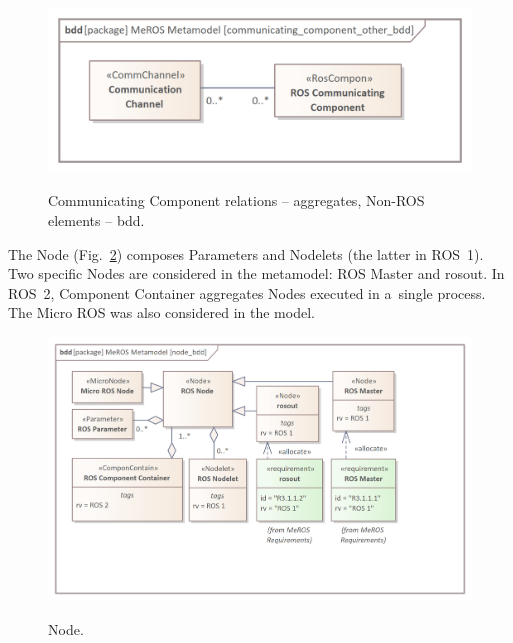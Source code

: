 \documentclass[11pt,oneside,a4paper]{report}
\begin{document}
	\begin{figure}[H]
		\centering
		\begin{center}
			{\includegraphics[scale=1.1]{img/meros_pkg/communicating_component_other_bdd.png}}
		\end{center}
		\caption{Communicating Component relations -- aggregates, Non-ROS elements -- bdd.} 
		\label{fig:communicating_component_other_bdd}
	\end{figure}
	

	\pagebreak
		 
 	The Node (Fig.~\ref{fig:node_bdd}) composes Parameters and Nodelets (the latter in ROS~1). Two specific Nodes are considered in the metamodel: ROS Master and rosout. In ROS~2, Component Container aggregates Nodes executed in a~single process. The Micro ROS was also considered in the model. 
 	

	 
 	\begin{figure}[H]
	 	\centering
	 	\begin{center}
	 		{\includegraphics[scale=1.0]{img/meros_pkg/node_bdd.png}}
	 	\end{center}
	 	\caption{Node.} 
		 	\label{fig:node_bdd}
	 \end{figure}
	 
\end{document}
